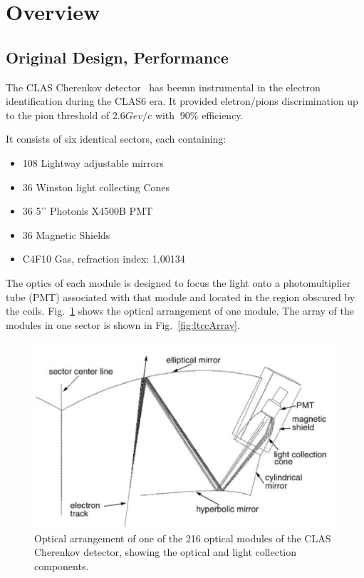 \section{Overview}



\subsection{Original Design, Performance}

The CLAS Cherenkov detector~\cite{Adams:2001kk} has beemn instrumental in the electron identification during the CLAS6 era.
It provided eletron/pions discrimination up to the pion threshold of $2.6 Gev/c$ with $~90\%$ efficiency.

It consists of six identical sectors, each containing:

\begin{itemize}
	\item 108 Lightway adjustable mirrors
	\item 36 Winston light collecting Cones
	\item 36 5’’ Photonis X4500B PMT
	\item 36 Magnetic Shields
	\item C4F10 Gas, refraction index: 1.00134
\end{itemize}


The optics of each module is designed to focus the light onto a photomultiplier tube (PMT) associated with that module and located in the region obscured by the coils.
Fig.~\ref{fig:optics} shows the optical arrangement of one module. The array of the modules in one sector is shown in Fig.~\ref{fig:ltccArray}.

\begin{figure}[hbt]
	\centering
	\includegraphics[width=1.0\columnwidth,keepaspectratio]{img/optics.png}
	\caption{Optical arrangement of one of the 216 optical modules of the CLAS Cherenkov detector, showing the optical and light collection components.}
	\label{fig:optics}
\end{figure}

